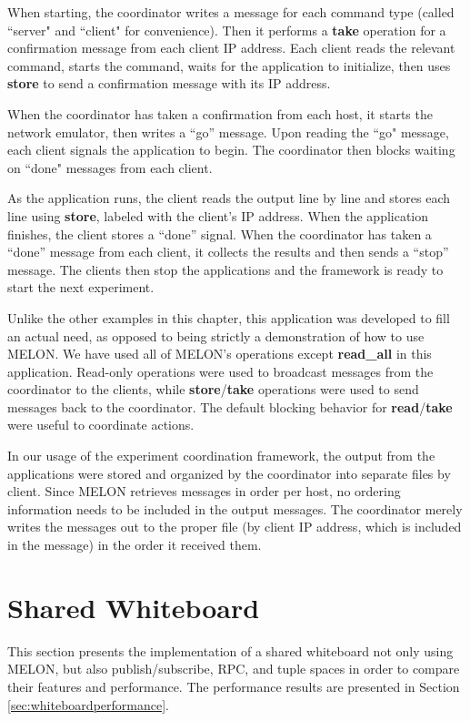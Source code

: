 When starting, the coordinator writes a message for each command type (called ``server" and ``client" for convenience). Then it performs a \textbf{take} operation for a confirmation message from each client IP address. Each client reads the relevant command, starts the command, waits for the application to initialize, then uses \textbf{store} to send a confirmation message with its IP address.

When the coordinator has taken a confirmation from each host, it starts the network emulator, then writes a ``go'' message. Upon reading the ``go" message, each client signals the application to begin. The coordinator then blocks waiting on ``done" messages from each client.

As the application runs, the client reads the output line by line and stores each line using \textbf{store}, labeled with the client's IP address. When the application finishes, the client stores a ``done'' signal. When the coordinator has taken a ``done'' message from each client, it collects the results and then sends a ``stop'' message. The clients then stop the applications and the framework is ready to start the next experiment.

Unlike the other examples in this chapter, this application was developed to fill an actual need, as opposed to being strictly a demonstration of how to use MELON. We have used all of MELON's operations except \textbf{read\_all} in this application. Read-only operations were used to broadcast messages from the coordinator to the clients, while \textbf{store}/\textbf{take} operations were used to send messages back to the coordinator. The default blocking behavior for \textbf{read}/\textbf{take} were useful to coordinate actions.

In our usage of the experiment coordination framework, the output from the applications were stored and organized by the coordinator into separate files by client. Since MELON retrieves messages in order per host, no ordering information needs to be included in the output messages. The coordinator merely writes the messages out to the proper file (by client IP address, which is included in the message) in the order it received them.

\section{Shared Whiteboard}\label{sec:wb}

This section presents the implementation of a shared whiteboard not only using MELON, but also publish/subscribe, RPC, and tuple spaces in order to compare their features and performance. The performance results are presented in Section \ref{sec:whiteboardperformance}.

